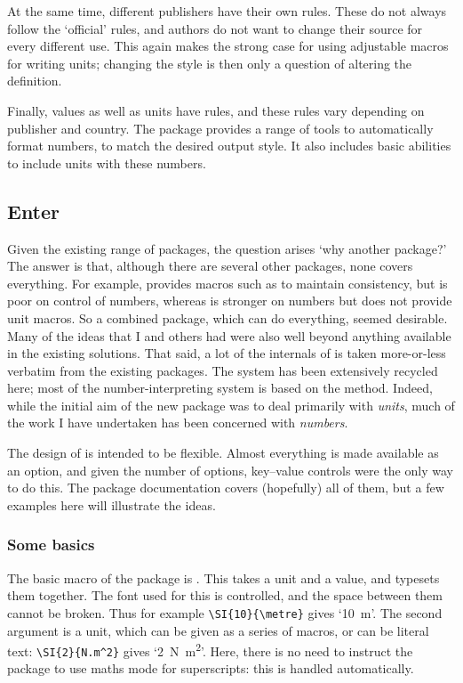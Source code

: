\begin{bibunit}
At the same time, different publishers have their own rules.
These do not always follow the `official' rules, and authors
do not want to change their source for every different use.
This again makes the strong case for using adjustable macros
for writing units; changing the style is then only a question
of altering the definition.

Finally, values as well as units have rules, and these rules
vary depending on publisher and country.  The 
package \cite{Harders2008} provides a range of tools to
automatically format numbers, to match the desired output
style.  It also includes basic abilities to include units with
these numbers.

\subsection{Enter }

Given the existing range of packages, the question arises `why
another package?'  The answer is that, although there are
several other packages, none covers everything. For example,
 provides macros such as  to maintain
consistency, but is poor on control of numbers, whereas
 is stronger on numbers but does not provide unit
macros.  So a combined package, which can do everything, seemed
desirable.  Many of the ideas that I and others had were also
well beyond anything available in the existing solutions.  That
said, a lot of the internals of  is taken
more-or-less verbatim from the existing packages.  The
 system has been extensively recycled here; most
of the number-interpreting system is based on the
 method.  Indeed, while the initial aim of the
new package was to deal primarily with \emph{units}, much of
the work I have undertaken has been concerned with
\emph{numbers}.

The design of  is intended to be flexible.  Almost
everything is made available as an option, and given the number
of options, key--value controls were the only way to do this.
The package documentation covers (hopefully) all of them, but a
few examples here will illustrate the ideas.

\subsubsection{Some basics}

The basic macro of the package is .  This takes a unit
and a value, and typesets them together.  The font used for
this is controlled, and the space between them cannot be
broken.  Thus for example \verb|\SI{10}{\metre}| gives
`\SI{10}{\metre}'.  The second argument is a unit, which can
be given as a series of macros, or can be literal text:
\verb|\SI{2}{N.m^2}| gives `\SI{2}{N.m^2}'.  Here, there is
no need to instruct the package to use maths mode for
superscripts: this is handled automatically.


\end{bibunit}
